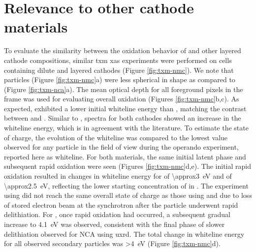 \documentclass{WileyMSP-template}
\begin{document}
\newpage %
\section{Relevance to other cathode materials}

To evaluate the similarity between the oxidation behavior of \nca{}
and other layered cathode compositions, similar \gls{txm} \gls{xas}
experiments were performed on cells containing dilute \nmc[333]{} and
\nmc[532]{} layered cathodes (Figure \ref{fig:txm-nmc}). We note that
\nmc{} particles (Figure \ref{fig:txm-nmc}a) were less spherical in
shape as compared to \nca{} (Figure \ref{fig:txm-nca}a). The mean
optical depth for all foreground pixels in the frame was used for
evaluating overall oxidation (Figures \ref{fig:txm-nmc}b,c). As
expected, \nmc[333]{} exhibited a lower initial whiteline energy than
\nca{}\cite{deb2005,muto2009}, matching the contrast between
 and . Similar to \nca{}, spectra for both
\nmc{} cathodes showed an increase in the whiteline energy, which is
in agreement with the literature\cite{deb2005}. To estimate the state
of charge, the evolution of the whiteline was compared to the lowest
value observed for any particle in the field of view during the
operando experiment, reported here as \textDelta{}whiteline. For both
\nmc{} materials, the same initial latent phase and subsequent rapid
oxidation were seen (Figures \ref{fig:txm-nmc}d,e). The initial rapid
 oxidation resulted in changes in whiteline energy for
\nmc[333]{} of \SI{\approx3}{\electronvolt} and \nmc[532]{} of
\SI{\approx2.5}{\electronvolt}, reflecting the lower starting
concentration of  in \nmc[333]{}. The experiment using
\nmc[532]{} did not reach the same overall state of charge as those
using \nmc[333]{} and \nca{} due to loss of stored electron beam at
the synchrotron after the particle underwent rapid delithiation. For
\nmc[333]{}, once rapid oxidation had occurred, a subsequent gradual
increase to \SI{4.1}{eV} was observed, consistent with the final phase
of slower delithiation observed for NCA using \gls{uxrd}. The total
change in whiteline energy for all observed secondary particles was
\SI{>4}{eV} (Figure \ref{fig:txm-nmc}d).
\end{document}
